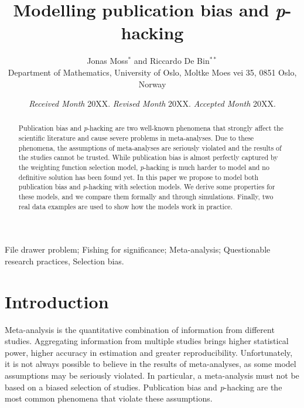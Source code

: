 \documentclass[useAMS,usenatbib,referee]{biom}
\author{Jonas Moss$^{*}$\email{jonasmgj@math.uio.no} and
Riccardo De Bin$^{**}$\email{debin@math.uio.no}\\
Department of Mathematics, University of Oslo, Moltke Moes vei 35, 0851 Oslo, Norway}
\title[Modelling publication bias and \textit{p}-hacking]{Modelling publication bias and \textit{p}-hacking}
\begin{document}
\date{{\it Received Month} 20XX. {\it Revised Month} 20XX.  {\it Accepted Month} 20XX.}

\pagerange{\pageref{firstpage}--\pageref{lastpage}} 


\label{firstpage}

\begin{abstract}
Publication bias and \textit{p}-hacking are two well-known phenomena that strongly affect the scientific literature and cause severe problems in meta-analyses. Due to these phenomena, the assumptions of meta-analyses are seriously violated and the results of the studies cannot be trusted. While publication bias is almost perfectly captured by the weighting function selection model, \textit{p}-hacking is much harder to model and no definitive solution has been found yet. In this paper we propose to model both publication bias and \textit{p}-hacking with selection models. We derive some properties for these models, and we compare them formally and through simulations. Finally, two real data examples are used to show how the models work in practice.
\end{abstract}

\begin{keywords}
File drawer problem; Fishing for significance; Meta-analysis; Questionable research practices, Selection bias.
\end{keywords}

\maketitle

\section{Introduction}

Meta-analysis is the quantitative combination of information from different studies. Aggregating information from multiple studies brings higher statistical power, higher accuracy in estimation and greater reproducibility. Unfortunately, it is not always possible to believe in the results of meta-analyses, as some model assumptions may be seriously violated. In particular, a meta-analysis must not be based on a biased selection of studies. Publication bias \citep{sterling1959publication} and \textit{p}-hacking \citep{simmons2011false} are the most common phenomena that violate these assumptions. 
\end{document}
